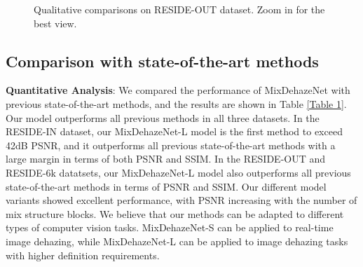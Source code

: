 \documentclass[10pt,twocolumn,letterpaper]{article}
\begin{document}
\begin{figure*}[htbp]
\centering
{}
\caption{Qualitative comparisons on RESIDE-OUT dataset. Zoom in for the best view.}
\label{Figure 6}
\end{figure*}

\subsection{Comparison with state-of-the-art methods }
\textbf{Quantitative Analysis}: We compared the performance of MixDehazeNet with previous state-of-the-art methods, and the results are shown in Table \ref{Table 1}. Our model outperforms all previous methods in all three datasets. In the RESIDE-IN dataset, our MixDehazeNet-L model is the first method to exceed 42dB PSNR, and it outperforms all previous state-of-the-art methods with a large margin in terms of both PSNR and SSIM. In the RESIDE-OUT and RESIDE-6k datatsets, our MixDehazeNet-L model also outperforms all previous state-of-the-art methods in terms of PSNR and SSIM. Our different model variants showed excellent performance, with PSNR increasing with the number of mix structure blocks. We believe that our methods can be adapted to different types of computer vision tasks. MixDehazeNet-S can be applied to real-time image dehazing, while MixDehazeNet-L can be applied to image dehazing tasks with higher definition requirements.
\end{document}
